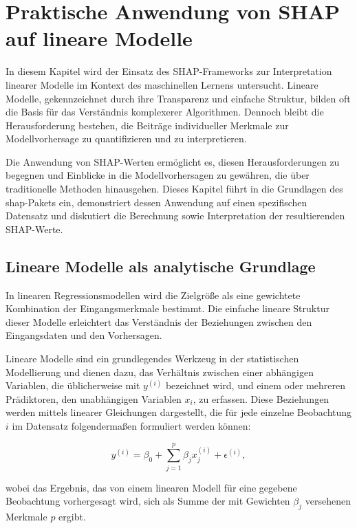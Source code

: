 \chapter{Praktische Anwendung von SHAP auf lineare Modelle}

In diesem Kapitel wird der Einsatz des SHAP-Frameworks zur Interpretation linearer Modelle im 
Kontext des maschinellen Lernens untersucht. Lineare Modelle, gekennzeichnet durch ihre Transparenz 
und einfache Struktur, bilden oft die Basis für das Verständnis komplexerer Algorithmen. 
Dennoch bleibt die Herausforderung bestehen, die Beiträge individueller Merkmale zur Modellvorhersage zu 
quantifizieren und zu interpretieren.

Die Anwendung von SHAP-Werten ermöglicht es, diesen Herausforderungen zu begegnen und Einblicke in 
die Modellvorhersagen zu gewähren, die über traditionelle Methoden hinausgehen. 
Dieses Kapitel führt in die Grundlagen des \textsf{shap}-Pakets ein, demonstriert dessen Anwendung auf einen 
spezifischen Datensatz und diskutiert die Berechnung sowie Interpretation der resultierenden SHAP-Werte.

\section{Lineare Modelle als analytische Grundlage}

In linearen Regressionsmodellen wird die Zielgröße als eine gewichtete Kombination der Eingangsmerkmale bestimmt. 
Die einfache lineare Struktur dieser Modelle erleichtert das Verständnis der Beziehungen zwischen den Eingangsdaten 
und den Vorhersagen. 

Lineare Modelle sind ein grundlegendes Werkzeug in der statistischen Modellierung und dienen dazu, das Verhältnis zwischen 
einer abhängigen Variablen, die üblicherweise mit $y^{(i)}$ bezeichnet wird, 
und einem oder mehreren Prädiktoren, den unabhängigen Variablen $x_i$, zu erfassen. 
Diese Beziehungen werden mittels linearer Gleichungen dargestellt, die für jede 
einzelne Beobachtung $i$ im Datensatz folgendermaßen formuliert werden können:

\begin{equation}
    y^{(i)} = \beta_0 + \sum_{j=1}^{p} \beta_j x^{(i)}_j + \epsilon^{(i)},
\label{eq:reg-model}
\end{equation}

wobei das Ergebnis, das von einem linearen Modell für eine gegebene Beobachtung vorhergesagt wird, sich als Summe der mit 
Gewichten $\beta_j$ versehenen Merkmale $p$ ergibt.

